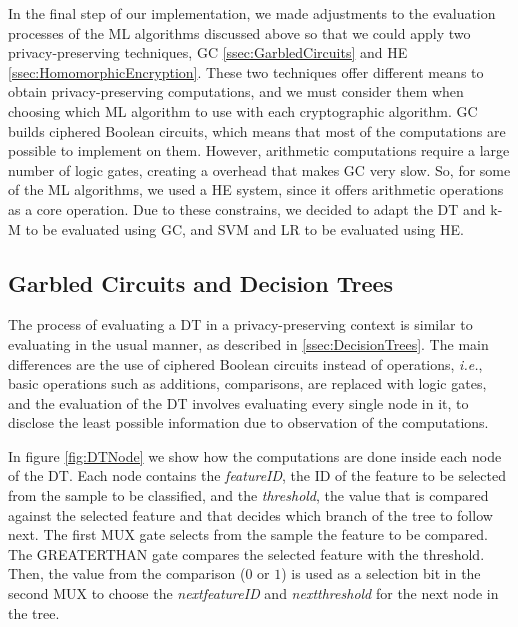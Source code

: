 In the final step of our implementation, we made adjustments to the evaluation processes of the \ac{ML} algorithms discussed above so that we could apply two privacy-preserving techniques, \ac{GC} \ref{ssec:GarbledCircuits} and \ac{HE} \ref{ssec:HomomorphicEncryption}.
These two techniques offer different means to obtain privacy-preserving computations, and we must consider them when choosing which \ac{ML} algorithm to use with each cryptographic algorithm. \ac{GC} builds ciphered Boolean circuits, which means that most of the computations are possible to implement on them. However, arithmetic computations require a large number of logic gates, creating a overhead that makes \ac{GC} very slow. So, for some of the \ac{ML} algorithms, we used a \ac{HE} system, since it offers arithmetic operations as a core operation. Due to these constrains, we decided to adapt the \ac{DT} and \ac{k-M} to be evaluated using \ac{GC}, and \ac{SVM} and \ac{LR} to be evaluated using \ac{HE}.


\subsection{Garbled Circuits and Decision Trees}
\label{ssec:GCandDT}

The process of evaluating a \ac{DT} in a privacy-preserving context is similar to evaluating in the usual manner, as described in \ref{ssec:DecisionTrees}. The main differences are the use of ciphered Boolean circuits instead of operations, \textit{i.e.}, basic operations such as additions, comparisons, are replaced with logic gates, and the evaluation of the \ac{DT} involves evaluating every single node in it, to disclose the least possible information due to observation of the computations.

In figure \ref{fig:DTNode} we show how the computations are done inside each node of the \ac{DT}. Each node contains the \textit{featureID}, the ID of the feature to be selected from the sample to be classified, and the \textit{threshold}, the value that is compared against the selected feature and that decides which branch of the tree to follow next. The first MUX gate selects from the sample the feature to be compared. The GREATERTHAN gate compares the selected feature with the threshold. Then, the value from the comparison ($0$ or $1$) is used as a selection bit in the second MUX to choose the \textit{next\textunderscore featureID} and \textit{next\textunderscore threshold} for the next node in the tree. 


